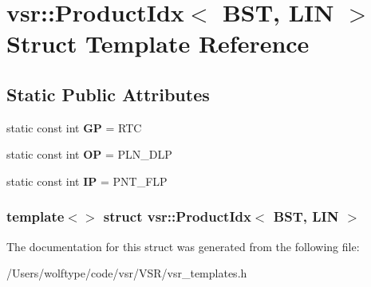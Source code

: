 \hypertarget{structvsr_1_1_product_idx_3_01_b_s_t_00_01_l_i_n_01_4}{\section{vsr\-:\-:Product\-Idx$<$ B\-S\-T, L\-I\-N $>$ Struct Template Reference}
\label{structvsr_1_1_product_idx_3_01_b_s_t_00_01_l_i_n_01_4}
}
\subsection*{Static Public Attributes}
\begin{DoxyCompactItemize}
\item 
\hypertarget{structvsr_1_1_product_idx_3_01_b_s_t_00_01_l_i_n_01_4_a59302b8f020457dfe954397c1b1acba8}{static const int {\bfseries G\-P} = R\-T\-C}\label{structvsr_1_1_product_idx_3_01_b_s_t_00_01_l_i_n_01_4_a59302b8f020457dfe954397c1b1acba8}

\item 
\hypertarget{structvsr_1_1_product_idx_3_01_b_s_t_00_01_l_i_n_01_4_a44a3ff02d65a1a89edebfbfc327ac54a}{static const int {\bfseries O\-P} = P\-L\-N\-\_\-\-D\-L\-P}\label{structvsr_1_1_product_idx_3_01_b_s_t_00_01_l_i_n_01_4_a44a3ff02d65a1a89edebfbfc327ac54a}

\item 
\hypertarget{structvsr_1_1_product_idx_3_01_b_s_t_00_01_l_i_n_01_4_aa211a4a87a7ea4cc5f9a86d64649ba6c}{static const int {\bfseries I\-P} = P\-N\-T\-\_\-\-F\-L\-P}\label{structvsr_1_1_product_idx_3_01_b_s_t_00_01_l_i_n_01_4_aa211a4a87a7ea4cc5f9a86d64649ba6c}

\end{DoxyCompactItemize}
\subsubsection*{template$<$$>$ struct vsr\-::\-Product\-Idx$<$ B\-S\-T, L\-I\-N $>$}



The documentation for this struct was generated from the following file\-:\begin{DoxyCompactItemize}
\item 
/\-Users/wolftype/code/vsr/\-V\-S\-R/vsr\-\_\-templates.\-h\end{DoxyCompactItemize}
